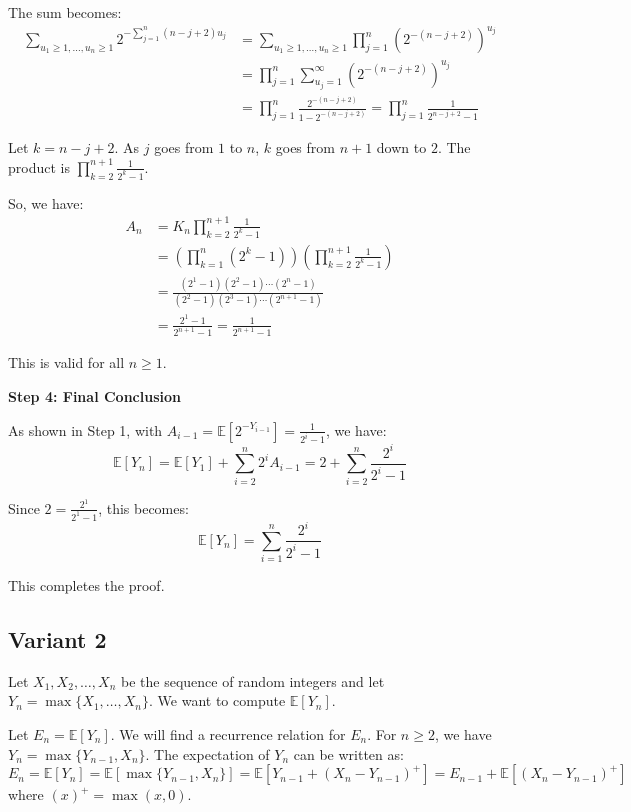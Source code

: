 \documentclass[12pt,a4paper]{article}
\theoremstyle{definition}
\begin{document}
        The sum becomes:
        \begin{align*}
            \sum_{u_1 \geq 1, \ldots, u_n \geq 1} 2^{-\sum_{j=1}^n (n-j+2)u_j} &= \sum_{u_1 \geq 1, \ldots, u_n \geq 1} \prod_{j=1}^n (2^{-(n-j+2)})^{u_j} \\
            &= \prod_{j=1}^n \sum_{u_j=1}^{\infty} (2^{-(n-j+2)})^{u_j} \\
            &= \prod_{j=1}^n \frac{2^{-(n-j+2)}}{1-2^{-(n-j+2)}} = \prod_{j=1}^n \frac{1}{2^{n-j+2}-1}
        \end{align*}

        Let $k=n-j+2$. As $j$ goes from $1$ to $n$, $k$ goes from $n+1$ down to $2$.
        The product is $\prod_{k=2}^{n+1} \frac{1}{2^k-1}$.

        So, we have:
        \begin{align*}
            A_n &= K_n \prod_{k=2}^{n+1} \frac{1}{2^k-1} \\
            &= \left(\prod_{k=1}^n (2^k-1)\right) \left(\prod_{k=2}^{n+1} \frac{1}{2^k-1}\right) \\
            &= \frac{(2^1-1)(2^2-1)\cdots(2^n-1)}{(2^2-1)(2^3-1)\cdots(2^{n+1}-1)} \\
            &= \frac{2^1-1}{2^{n+1}-1} = \frac{1}{2^{n+1}-1}
        \end{align*}

        This is valid for all $n \geq 1$.

        \textbf{Step 4: Final Conclusion}

        As shown in Step 1, with $A_{i-1} = \mathbb{E}[2^{-Y_{i-1}}] = \frac{1}{2^i-1}$, we have:
        \[ \mathbb{E}[Y_n] = \mathbb{E}[Y_1] + \sum_{i=2}^n 2^i A_{i-1} = 2 + \sum_{i=2}^n \frac{2^i}{2^i-1} \]

        Since $2 = \frac{2^1}{2^1-1}$, this becomes:
        \[ \mathbb{E}[Y_n] = \sum_{i=1}^n \frac{2^i}{2^i-1} \]

        This completes the proof.

    \subsection{Variant 2}
    Let $X_1, X_2, \dots, X_n$ be the sequence of random integers and let $Y_n = \max\{X_1, \dots, X_n\}$. We want to compute $\mathbb{E}[Y_n]$.

    Let $E_n = \mathbb{E}[Y_n]$. We will find a recurrence relation for $E_n$.
    For $n \geq 2$, we have $Y_n = \max\{Y_{n-1}, X_n\}$.
    The expectation of $Y_n$ can be written as:
    \[ E_n = \mathbb{E}[Y_n] = \mathbb{E}[\max\{Y_{n-1}, X_n\}] = \mathbb{E}[Y_{n-1} + (X_n - Y_{n-1})^+] = E_{n-1} + \mathbb{E}[(X_n - Y_{n-1})^+] \]
    where $(x)^+ = \max(x, 0)$.
\end{document}
